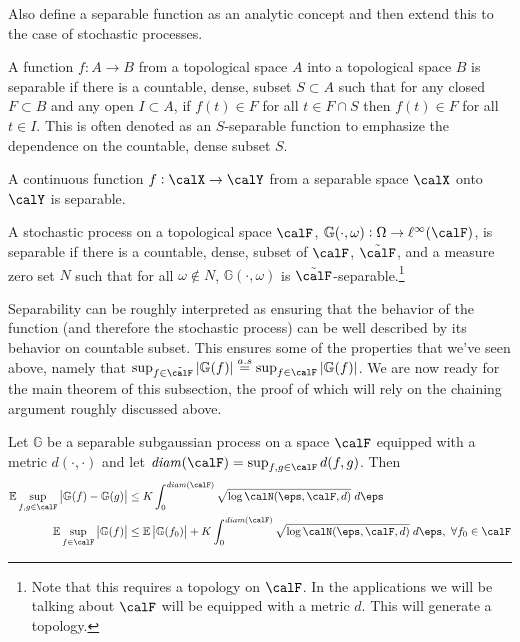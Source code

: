 Also define a separable function as an analytic concept and then extend this to the case of stochastic processes.

\begin{definition}
	\label{def:separable-function}
	A function \(f:A\to B\) from a topological space \(A\) into a topological space  \(B\) is separable if there is a countable, dense, subset  \(S \subset A\) such that  for any closed \(F \subset B\) and any open \(I \subset A\), if  \(f(t) \in F\) for all  \(t \in F \cap S\) then  \(f(t) \in F\) for all  \(t \in I\). This is often denoted as an \(S\)-separable function to emphasize the dependence on the countable, dense subset  \(S\).
\end{definition}
\begin{lemma}
	\label{lemma:continuous-separable}
	A continuous function \(f:\calX\to\calY\) from a separable space \(\calX\) onto  \(\calY\) is separable.
\end{lemma}


\begin{definition}
	\label{def:separable-process}
	A stochastic process on a topological space \(\calF\), \(\mathbb{G}(\cdot,\omega):\Omega \to \ell^\infty(\calF)\), is separable if there is a countable, dense, subset of \(\calF\), \(\tilde\calF\), and a measure zero set \(N\) such that for all \(\omega\not\in N\),  \(\mathbb{G}(\cdot,\omega)\) is \(\tilde\calF\)-separable.\footnote{Note that this requires a topology on \(\calF\). In the applications we will be talking about  \(\calF\) will be equipped with a metric  \(d\). This will generate a topology.} 
\end{definition}


Separability can be roughly interpreted as ensuring that the behavior of the function (and therefore the stochastic process) can be well described by its behavior on countable subset. This ensures some of the properties that we've seen above, namely that \(\sup_{f\in\tilde\calF}|\mathbb{G}(f)| \overset{a.s}{=} \sup_{f\in\calF}|\mathbb{G}(f)|\). We are now ready for the main theorem of this subsection, the proof of which will rely on the chaining argument roughly discussed above.

\begin{theorem}
	\label{thm:vdv2.2.4}
	Let \(\mathbb{G}\) be a separable subgaussian process on a space \(\calF\) equipped with a metric  \(d(\cdot,\cdot)\) and let \(\text{\emph{diam}}(\calF) = \sup_{f,g\in\calF}d(f,g) \). Then
	\begin{align}
		\label{eq:vdv2.2.4-1}
		\E\sup_{f,g\in\calF}\left|\mathbb{G}(f)-\mathbb{G}(g)\right|
		&\leq K \int_{0}^{\text{\emph{diam}}(\calF)} \sqrt{\log \calN(\eps, \calF, d)}\;d\eps \\
		\label{eq:vdv2.2.4-2}
		\E\sup_{f\in\calF}\left|\mathbb{G}(f)\right| &\leq \E\left|\mathbb{G}(f_0)\right| + K \int_{0}^{\text{\emph{diam}}(\calF)} \sqrt{\log \calN(\eps, \calF, d)}\;d\eps,\hbox{ }\forall f_0\in\calF
	\end{align}
\end{theorem}

